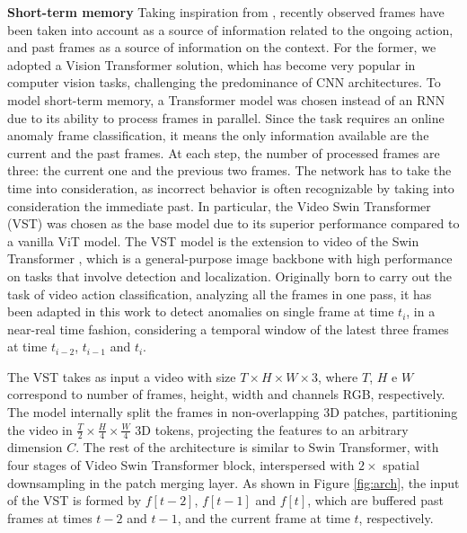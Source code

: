 \noindent\textbf{Short-term memory}
Taking inspiration from \cite{xu2021long}, recently observed frames have been taken into account as a source of information related to the ongoing action, and past frames as a source of information on the context.
For the former, we adopted a Vision Transformer \cite{DBLP:conf/iclr/DosovitskiyB0WZ21} solution, which has become very popular in computer vision tasks, challenging the predominance of CNN architectures.
To model short-term memory, a Transformer model was chosen instead of an RNN due to its ability to process frames in parallel.
Since the task requires an online anomaly frame classification, it means the only information available are the current and the past frames.
At each step, the number of processed frames are three: the current one and the previous two frames.
The network has to take the time into consideration, as incorrect behavior is often recognizable by taking into consideration the immediate past.
In particular, the Video Swin Transformer (VST) \cite{liu_video_2022} was chosen as the base model due to its superior performance compared to a vanilla ViT \cite{DBLP:conf/iclr/DosovitskiyB0WZ21} model.
The VST model is the extension to video of the Swin Transformer \cite{liu2021Swin}, which is a general-purpose image backbone with high performance on tasks that involve detection and localization.
Originally born to carry out the task of video action classification, analyzing all the frames in one pass, it has been adapted in this work to detect anomalies on single frame at time $t_{i}$, in a near-real time fashion, considering a temporal window of the latest three frames at time $t_{i-2}$, $t_{i-1}$ and $t_{i}$.

The VST takes as input a video with size $T \times H \times W \times 3$, where $T$, $H$ e $W$ correspond to number of frames, height, width and channels RGB, respectively.
The model internally split the frames in non-overlapping 3D patches, partitioning the video in $\frac{T}{2} \times \frac{H}{4} \times \frac{W}{4}$ 3D tokens, projecting the features to an arbitrary dimension $C$.
The rest of the architecture is similar to Swin Transformer, with four stages of Video Swin Transformer block, interspersed with $2\times$ spatial downsampling in the patch merging layer.
As shown in Figure \ref{fig:arch}, the input of the VST is formed by $f[t-2]$, $f[t-1]$ and $f[t]$, which are buffered past frames at times $t-2$ and $t-1$, and the current frame at time $t$, respectively.

